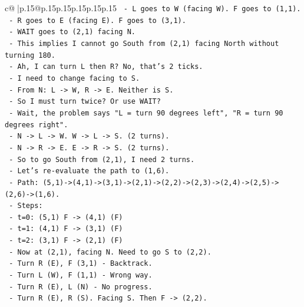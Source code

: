 \documentclass{article}
\begin{document}
{\begin{supertabular}{c@{$\;$}|p{.15\linewidth}@{}p{.15\linewidth}p{.15\linewidth}p{.15\linewidth}p{.15\linewidth}p{.15\linewidth}}
{{{\texttt{                {-} L goes to W (facing W). F goes to (1,1).} \\
\texttt{                {-} R goes to E (facing E). F goes to (3,1).} \\
\texttt{                {-} WAIT goes to (2,1) facing N.} \\
\texttt{                {-} This implies I cannot go South from (2,1) facing North without turning 180.} \\
\texttt{                {-} Ah, I can turn L then R? No, that's 2 ticks.} \\
\texttt{                {-} I need to change facing to S.} \\
\texttt{                {-} From N: L {-}> W, R {-}> E. Neither is S.} \\
\texttt{                {-} So I must turn twice? Or use WAIT?} \\
\texttt{                {-} Wait, the problem says "L = turn 90 degrees left", "R = turn 90 degrees right".} \\
\texttt{                {-} N {-}> L {-}> W. W {-}> L {-}> S. (2 turns).} \\
\texttt{                {-} N {-}> R {-}> E. E {-}> R {-}> S. (2 turns).} \\
\texttt{                {-} So to go South from (2,1), I need 2 turns.} \\
\texttt{                {-} Let's re{-}evaluate the path to (1,6).} \\
\texttt{                {-} Path: (5,1){-}>(4,1){-}>(3,1){-}>(2,1){-}>(2,2){-}>(2,3){-}>(2,4){-}>(2,5){-}>(2,6){-}>(1,6).} \\
\texttt{                {-} Steps:} \\
\texttt{                  {-} t=0: (5,1) F {-}> (4,1) (F)} \\
\texttt{                  {-} t=1: (4,1) F {-}> (3,1) (F)} \\
\texttt{                  {-} t=2: (3,1) F {-}> (2,1) (F)} \\
\texttt{                  {-} Now at (2,1), facing N. Need to go S to (2,2).} \\
\texttt{                  {-} Turn R (E), F (3,1) {-} Backtrack.} \\
\texttt{                  {-} Turn L (W), F (1,1) {-} Wrong way.} \\
\texttt{                  {-} Turn R (E), L (N) {-} No progress.} \\
\texttt{                  {-} Turn R (E), R (S). Facing S. Then F {-}> (2,2).} \\
}}}
\end{supertabular}}
\end{document}
